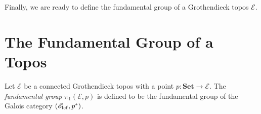 Finally, we are ready to define the fundamental group of a Grothendieck topos $\mathscr{E}$.

\section{The Fundamental Group of a Topos}

\begin{definition}
\label{def:fundamental group of a topos}
Let $\mathscr{E}$ be a connected Grothendieck topos with a point $p : \mathbf{Set} \to \mathscr{E}$. The \emph{fundamental group} $\pi_1\left(\mathscr{E}, p \right)$ is defined to be the fundamental group of the Galois category $(\mathscr{E}_{\operatorname{lcf}}, p^*)$.
\end{definition}


